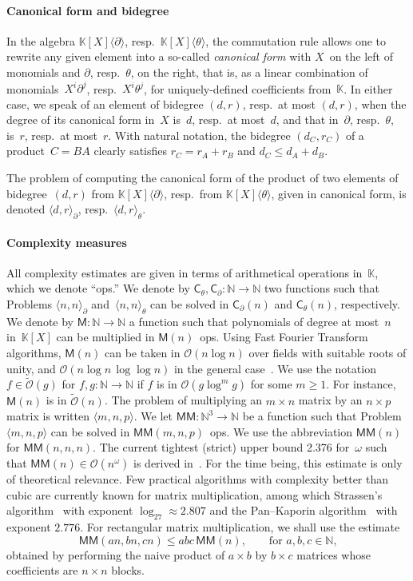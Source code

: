 \documentclass{sig-alt-full}
\newcommand{\x}{X}
\newcommand{\Tx}{\theta}
\newcommand{\Dx}{\partial}
\newcommand{\bigO}{{\mathcal{O}}}
\newcommand{\bigOsoft}{\tilde{\mathcal{O}}}
\newcommand{\MM}{\mathsf{MM}}
\def\OMul#1#2#3{\langle #1,#2 \rangle_{#3}}
\def\MMul#1#2#3{\langle #1,#2,#3 \rangle}
\newcommand{\sC}{\mathsf{C}}
\newcommand{\sM}{\mathsf{M}}
\newcommand{\bK}{\mathbb{K}}
\newcommand{\bN}{\mathbb{N}}
\begin{document}
\paragraph*{Canonical form and bidegree}
In the algebra $\bK[\x]\langle\Dx\rangle$, resp.~$\bK[\x]\langle\Tx\rangle$, the commutation rule allows one to rewrite any given element into a so-called \emph{canonical form\/} with $\x$~on the left of monomials and $\Dx$, resp.~$\Tx$, on the right, that is, as a linear combination of monomials~$\x^i\Dx^j$, resp.~$\x^i\Tx^j$, for uniquely-defined coefficients from~$\bK$.
In either case, we speak of an element of bidegree $(d,r)$, resp.~at most $(d,r)$, when the degree of its canonical form in~$\x$ is~$d$, resp.~at most~$d$, and that in~$\Dx$, resp.~$\Tx$, is~$r$, resp.~at most~$r$.
With natural notation, the bidegree $(d_C,r_C)$ of a product~$C=BA$ clearly satisfies $r_C=r_A+r_B$ and $d_C\leq d_A + d_B$.

The problem of computing the canonical form of the product of two elements of bidegree~$(d,r)$ from $\bK[\x]\langle\Dx\rangle$, resp.\ from $\bK[\x]\langle\Tx\rangle$, given in canonical form, is denoted $\OMul dr\Dx$, resp.\ $\OMul dr\Tx$.


\paragraph*{Complexity measures}
All complexity estimates are given in terms of arithmetical operations in~$\bK$, which we denote ``ops.''
We denote by $\sC_\Tx, \sC_\Dx:\bN \rightarrow \bN$ two functions such that Problems $\OMul nn\Dx$ and~$\OMul nn\Tx$ can be solved in $\sC_\Dx(n)$ and $\sC_\Tx(n)$, respectively.
We denote by $\sM: \bN \rightarrow \bN$ a function such that polynomials of degree at most~$n$ in~$\bK[\x]$ can be multiplied in $\sM(n)$~ops.
Using Fast Fourier Transform algorithms, $\sM(n)$ can be taken in $\bigO(n \log n)$ over fields with suitable roots of unity, and $\bigO(n \log n\,\log\log n)$ in the general case~\cite{ScSt71,CaKa91}. 
We use the notation $f \in \bigOsoft(g)$ for $f,g:\bN \rightarrow \bN$ if $f$ is in $\bigO(g \log^mg)$ for some $m\geq 1$.
For instance, $\sM(n)$ is in $\bigOsoft(n)$.
The problem of multiplying an $m \times n$ matrix by an $n \times p$ matrix is written $\MMul mnp$. 
We let $\MM: \bN^3 \rightarrow \bN$ be a function such that Problem  $\MMul mnp$ can be solved in $\MM(m,n,p)$~ops.
We use the abbreviation $\MM(n)$ for $\MM(n,n,n)$.
The current tightest (strict) upper bound 2.376 for~$\omega$ such that $\MM(n)\in\bigO(n^\omega)$ is derived in~\cite{CoWi90}.
For the time being, this estimate is only of theoretical relevance.
Few practical algorithms with complexity better than cubic are currently known  for matrix multiplication, among which
Strassen's algorithm~\cite{Strassen69} with exponent $\log_27 \approx 2.807$ and the Pan--Kaporin algorithm~\cite{Kaporin04} with exponent $2.776$.
For rectangular matrix multiplication,
we shall use the estimate
\begin{equation}\label{eq:naive-abc}
\MM(an,bn,cn) \leq abc \, \MM(n),\qquad\text{for $a,b,c \in \bN$,}
\end{equation}
obtained by performing the naive product of $a\times b$ by $b\times c$ matrices whose coefficients are $n\times n$ blocks.
\end{document}
